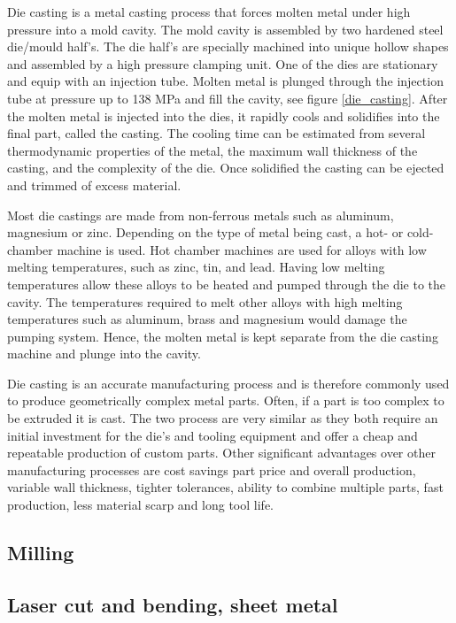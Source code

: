 Die casting is a metal casting process that forces molten metal under high pressure into a mold cavity. The mold cavity is assembled by two hardened steel die/mould half's. The die half's are specially machined into unique hollow shapes and assembled by a high pressure clamping unit. One of the dies are stationary and equip with an injection tube. Molten metal is plunged through the injection tube at pressure up to 138 MPa and fill the cavity, see figure \ref{die_casting}. After the molten metal is injected into the dies, it rapidly cools and solidifies into the final part, called the casting. The cooling time can be estimated from several thermodynamic properties of the metal, the maximum wall thickness of the casting, and the complexity of the die. \cite{die_casting} Once solidified the casting can be ejected and trimmed of excess material. 
\par
Most die castings are made from non-ferrous metals such as aluminum, magnesium or zinc. Depending on the type of metal being cast, a hot- or cold-chamber machine is used. Hot chamber machines are used for alloys with low melting temperatures, such as zinc, tin, and lead. Having low melting temperatures allow these alloys to be heated and pumped through the die to the cavity. The temperatures required to melt other alloys with high melting temperatures such as aluminum, brass and magnesium would damage the pumping system. Hence, the molten metal is kept separate from the die casting machine and plunge into the cavity. \cite{die_casting2}  
\par
Die casting is an accurate manufacturing process and is therefore commonly used to produce geometrically complex metal parts. Often, if a part is too complex to be extruded it is cast. The two process are very similar as they both require an initial investment for the die's and tooling equipment and offer a cheap and repeatable production of custom parts. Other significant advantages over other manufacturing processes are cost savings part price and overall production, variable wall thickness, tighter tolerances, ability to combine multiple parts, fast production, less material scarp and long tool life.

\subsection{Milling}

\cite{cnc_picture}
\subsection{Laser cut and bending, sheet metal}

